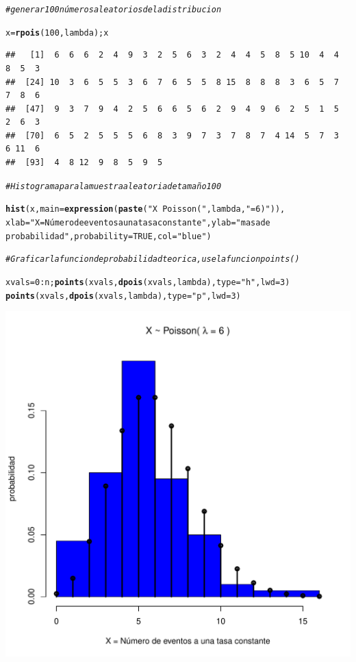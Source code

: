 \documentclass[12pt,letterpaper]{article}\usepackage[]{graphicx}\usepackage[]{color}
\makeatletter
\def\maxwidth{ %
  \ifdim\Gin@nat@width>\linewidth
    \linewidth
  \else
    \Gin@nat@width
  \fi
}
\newcommand{\hlnum}[1]{\textcolor[rgb]{0.686,0.059,0.569}{#1}}%
\newcommand{\hlstr}[1]{\textcolor[rgb]{0.192,0.494,0.8}{#1}}%
\newcommand{\hlcom}[1]{\textcolor[rgb]{0.678,0.584,0.686}{\textit{#1}}}%
\newcommand{\hlopt}[1]{\textcolor[rgb]{0,0,0}{#1}}%
\newcommand{\hlstd}[1]{\textcolor[rgb]{0.345,0.345,0.345}{#1}}%
\newcommand{\hlkwb}[1]{\textcolor[rgb]{0.69,0.353,0.396}{#1}}%
\newcommand{\hlkwc}[1]{\textcolor[rgb]{0.333,0.667,0.333}{#1}}%
\newcommand{\hlkwd}[1]{\textcolor[rgb]{0.737,0.353,0.396}{\textbf{#1}}}%
\newenvironment{kframe}{%
 \def\at@end@of@kframe{}%
 \ifinner\ifhmode%
  \def\at@end@of@kframe{\end{minipage}}%
  \begin{minipage}{\columnwidth}%
 \fi\fi%
 \def\FrameCommand##1{\hskip\@totalleftmargin \hskip-\fboxsep
 \colorbox{shadecolor}{##1}\hskip-\fboxsep
     \hskip-\linewidth \hskip-\@totalleftmargin \hskip\columnwidth}%
 \MakeFramed {\advance\hsize-\width
   \@totalleftmargin\z@ \linewidth\hsize
   \@setminipage}}%
 {\par\unskip\endMakeFramed%
 \at@end@of@kframe}
\newenvironment{knitrout}{}{} %
\makeatother
\begin{document}
\begin{itemize}
\begin{knitrout}
\begin{kframe}
\begin{alltt}
\hlcom{# generar 100 números aleatorios de la distribucion}

\hlstd{x} \hlkwb{=} \hlkwd{rpois}\hlstd{(}\hlnum{100}\hlstd{, lambda); x}
\end{alltt}
\begin{verbatim}
##   [1]  6  6  6  2  4  9  3  2  5  6  3  2  4  4  5  8  5 10  4  4  8  5  3
##  [24] 10  3  6  5  5  3  6  7  6  5  5  8 15  8  8  8  3  6  5  7  7  8  6
##  [47]  9  3  7  9  4  2  5  6  6  5  6  2  9  4  9  6  2  5  1  5  2  6  3
##  [70]  6  5  2  5  5  5  6  8  3  9  7  3  7  8  7  4 14  5  7  3  6 11  6
##  [93]  4  8 12  9  8  5  9  5
\end{verbatim}
\begin{alltt}
\hlcom{# Histograma para la muestra aleatoria de tamaño 100}

\hlkwd{hist}\hlstd{(x,} \hlkwc{main}\hlstd{=}\hlkwd{expression}\hlstd{(}\hlkwd{paste}\hlstd{(}\hlstr{"X ~ Poisson( "}\hlstd{, lambda,} \hlstr{" = 6 )"}\hlstd{)),}
\hlkwc{xlab}\hlstd{=}\hlstr{"X = Número de eventos a una tasa constante"}\hlstd{,} \hlkwc{ylab}\hlstd{=}\hlstr{"masa de 
probabilidad"}\hlstd{,} \hlkwc{probability}\hlstd{=}\hlnum{TRUE}\hlstd{,} \hlkwc{col}\hlstd{=}\hlstr{"blue"}\hlstd{)}

\hlcom{# Graficar la funcion de probabilidad teorica, use la funcion points()}

\hlstd{xvals}\hlkwb{=}\hlnum{0}\hlopt{:}\hlstd{n;} \hlkwd{points}\hlstd{(xvals,} \hlkwd{dpois}\hlstd{(xvals, lambda),} \hlkwc{type}\hlstd{=}\hlstr{"h"}\hlstd{,} \hlkwc{lwd}\hlstd{=}\hlnum{3}\hlstd{)}
\hlkwd{points}\hlstd{(xvals,} \hlkwd{dpois}\hlstd{(xvals, lambda),} \hlkwc{type}\hlstd{=}\hlstr{"p"}\hlstd{,} \hlkwc{lwd}\hlstd{=}\hlnum{3}\hlstd{)}
\end{alltt}
\end{kframe}
\includegraphics[width=\maxwidth]{figure/unnamed-chunk-30-1} 

\end{knitrout}
\end{itemize}
\end{document}
